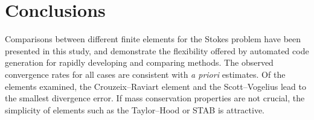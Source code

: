 \section{Conclusions}

Comparisons between different finite elements for the Stokes problem have
been presented in this study, and demonstrate the flexibility offered by
automated code generation for rapidly developing and comparing methods.
The observed convergence rates for all cases are consistent with \emph{a
priori} estimates.  Of the elements examined, the Crouzeix--Raviart
element and the Scott--Vogelius lead to the smallest divergence error.
If mass conservation properties are not crucial, the simplicity of
elements such as the Taylor--Hood or STAB is attractive.
